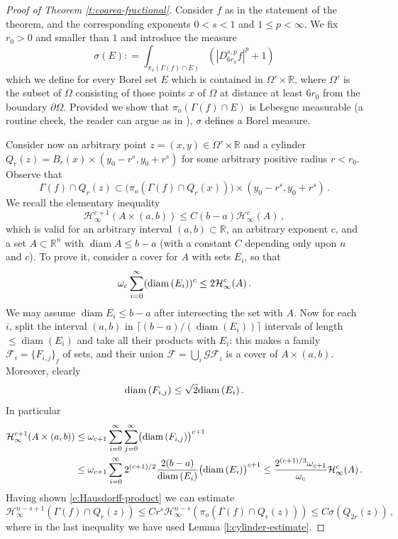 \documentclass[11pt,reqno]{amsart}
\renewcommand{\H}{\mathcal{H}}
\theoremstyle{definition}
\numberwithin{equation}{section}
\begin{document}
\begin{proof}[Proof of Theorem \ref{t:coarea-fractional}] Consider $f$ as in the statement of the theorem, and the corresponding exponents $0<s<1$ and $1\leq p < \infty$.
We fix $r_0>0$ and smaller than $1$ and introduce the measure 
\begin{equation}\label{e:sigma-measure}
\sigma(E) : =\int_{\pi_o (\Gamma (f) \cap E)}\left(|D^{s,p}_{6r_0} f|^p+1\right)
\end{equation}
which we define for every Borel set $E$ which is contained in $\Omega'\times \mathbb R$, where $\Omega'$ is the subset of $\Omega$ consisting of those points $x$ of $\Omega$ at distance at least $6r_0$ from the boundary $\partial \Omega$. Provided we show that $\pi_o (\Gamma (f) \cap E)$ is Lebesgue measurable (a routine check, the reader can argue as in \cite{MSZ03}), $\sigma$ defines a Borel measure. 

Consider now an arbitrary point $z= (x,y) \in \Omega'\times \mathbb R$ and  a cylinder $Q_r (z) = B_r (x) \times (y_0-r^s, y_0+r^s)$ for some arbitrary positive radius $r< r_0$.  Observe that 
\[
\Gamma (f) \cap Q_r (z) \subset \bigl(\pi_o (\Gamma (f)\cap Q_r (x))\bigr) \times (y_0-r^s, y_0+r^s)\, .
\]
We recall the elementary inequality 
\begin{equation}\label{e:Hausdorff-product}
\mathcal{H}^{c+1}_\infty (A \times (a,b))\leq C (b-a) \mathcal{H}^c_\infty (A)\, , 
\end{equation}
which is valid for an arbitrary interval $(a,b)\subset \mathbb R$, an arbitrary exponent $c$, and a set $A\subset \mathbb R^n$ with $\operatorname{diam} A\le b-a$ (with a constant $C$ depending only upon $n$ and $c$). To prove it, consider a cover for $A$ with sets $E_i$, so that 
\[
\omega_c \sum_{i=0}^\infty ({\rm diam}\, (E_i))^c \leq 2 \mathcal{H}^c_\infty (A) \, .
\]
We may assume $\operatorname{diam}E_i\le b-a$ after intersecting the set with $A$. Now for
each $i$, split the interval $(a,b)$ in $\lceil(b-a)/(\operatorname{diam} (E_i))\rceil$
intervals of length $\le\operatorname{diam} (E_i)$ and take all their products with
$E_i$: this makes a family $\mathcal{F}_i = \{F_{i,j}\}_j$ of sets, and their union $\mathcal{F}= \bigcup_i \mathcal{GF}_i$ is a cover of $A\times (a,b)$. Moreover, clearly 
\[
{\rm diam}\, (F_{i,j}) \leq \sqrt{2} {\rm diam}\, (E_i)\, .
\]
In particular
\begin{align*}
\mathcal{H}^{c+1}_\infty (A\times (a,b)) &\leq \omega_{c+1} \sum_{i=0}^\infty \sum_{j=0}^\infty \bigl({\rm diam}\, (F_{i,j})\bigr)^{c+1}\\
& \leq \omega_{c+1} \sum_{i=0}^\infty 2^{(c+1)/2} \frac{2 (b-a)}{{\rm diam}\, (E_i)}\bigl( {\rm diam}\, (E_i)\bigr)^{c+1} \leq \frac{2^{(c+1)/3} \omega_{c+1}}{\omega_c} \mathcal{H}^c_\infty (A)\, .
\end{align*}
Having shown \eqref{e:Hausdorff-product} we can estimate 
\begin{equation}\label{e:local}
\H^{n-s+1}_\infty(\Gamma (f) \cap Q_r (z))\le Cr^s\H^{n-s}_\infty(\pi_o(\Gamma (f) \cap Q_r (z)))\le C\sigma(Q_{2r} (z))\, ,
\end{equation}
where in the last inequality we have used Lemma \ref{l:cylinder-estimate}. 


\end{proof}
\end{document}
